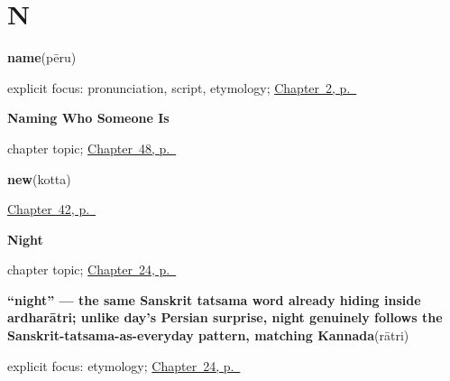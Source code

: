 \section*{N}

\noindent\begin{minipage}[t]{\linewidth}
\raggedright
\textbf{name}\enspace\emph{}\enspace(pēru)\par
\footnotesize explicit focus: pronunciation, script, etymology; \hyperref[ch:introductions]{Chapter~2, p.~\pageref*{ch:introductions}}
\end{minipage}\par\smallskip

\noindent\begin{minipage}[t]{\linewidth}
\raggedright
\textbf{Naming Who Someone Is}\par
\footnotesize chapter topic; \hyperref[ch:te-roles]{Chapter~48, p.~\pageref*{ch:te-roles}}
\end{minipage}\par\smallskip

\noindent\begin{minipage}[t]{\linewidth}
\raggedright
\textbf{new}\enspace\emph{}\enspace(kotta)\par
\footnotesize \hyperref[ch:te-describing-things]{Chapter~42, p.~\pageref*{ch:te-describing-things}}
\end{minipage}\par\smallskip

\noindent\begin{minipage}[t]{\linewidth}
\raggedright
\textbf{Night}\par
\footnotesize chapter topic; \hyperref[ch:te-night]{Chapter~24, p.~\pageref*{ch:te-night}}
\end{minipage}\par\smallskip

\noindent\begin{minipage}[t]{\linewidth}
\raggedright
\textbf{\textquotedblleft{}night\textquotedblright{} — the same Sanskrit tatsama word already hiding inside ardharātri; unlike day's Persian surprise, night genuinely follows the Sanskrit-tatsama-as-everyday pattern, matching Kannada}\enspace\emph{}\enspace(rātri)\par
\footnotesize explicit focus: etymology; \hyperref[ch:te-night]{Chapter~24, p.~\pageref*{ch:te-night}}
\end{minipage}\par\smallskip

